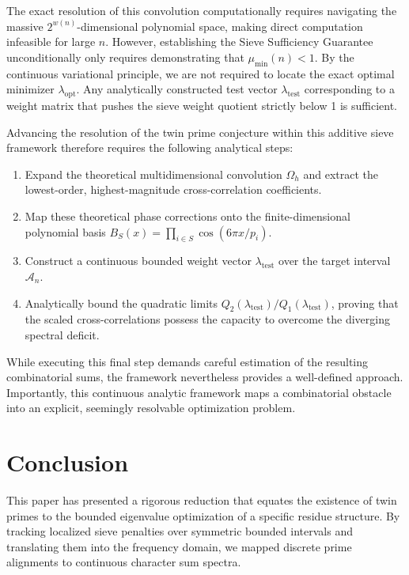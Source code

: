 \documentclass[reqno,notitlepage]{amsart}
\begin{document}
The exact resolution of this convolution computationally requires navigating the massive
$2^{w(n)}$-dimensional polynomial space, making direct computation infeasible
for large $n$. However, establishing the Sieve Sufficiency Guarantee unconditionally only
requires demonstrating that $\mu_{\min}(n) < 1$. By the continuous variational principle, we are not
required to locate the exact optimal minimizer $\lambda_{\mathrm{opt}}$. Any analytically constructed test
vector $\lambda_{\mathrm{test}}$ corresponding to a weight matrix that pushes the sieve weight quotient strictly
below 1 is sufficient. 

Advancing the resolution of the twin prime conjecture within this additive sieve framework therefore
requires the following analytical steps:
\begin{enumerate}
    \item Expand the theoretical multidimensional convolution $\Omega_h$ and extract the lowest-order,
highest-magnitude cross-correlation coefficients.
    \item Map these theoretical phase corrections onto the finite-dimensional polynomial basis
    $B_S(x) = \prod_{i \in S} \cos(6\pi x/p_i)$.
    \item Construct a continuous bounded weight vector $\lambda_{\mathrm{test}}$ over the target interval
    $\mathcal{A}_n$.
    \item Analytically bound the quadratic limits $Q_2(\lambda_{\mathrm{test}}) / Q_1(\lambda_{\mathrm{test}})$, proving
    that the scaled cross-correlations possess the capacity to overcome the diverging
    spectral deficit.
\end{enumerate}

While executing this final step demands careful estimation of the resulting combinatorial sums, the
framework nevertheless provides a well-defined approach. Importantly, this continuous analytic
framework maps a combinatorial obstacle into an explicit, seemingly resolvable optimization problem.

\section{Conclusion} \label{sec:conclusion}

This paper has presented a rigorous reduction that equates the existence of twin primes to
the bounded eigenvalue optimization of a specific residue structure. By tracking localized sieve
penalties over symmetric bounded intervals and translating them into the frequency domain, we
mapped discrete prime alignments to continuous character sum spectra. 
\end{document}
